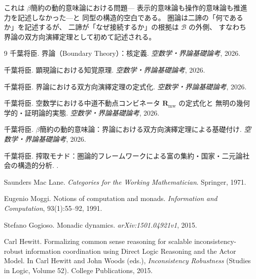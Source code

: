 \documentclass[11pt,a4paper]{ltjsarticle}
\theoremstyle{definition}
\begin{document}
これは $\beta$簡約の動的意味論における問題---
表示的意味論も操作的意味論も推進力を記述しなかった---と
同型の構造的空白である。
圏論は二諦の「何であるか」を記述するが、
二諦が「なぜ接続するか」の根拠は $\mathcal{B}$ の外側、
すなわち界論の双方向演繹定理として初めて記述される。

\begin{thebibliography}{9}
千葉将臣.
\newblock 界論（Boundary Theory）：核定義.
\newblock \emph{空数学・界論基礎論考}, 2026.

千葉将臣.
\newblock 顕現論における知覚原理.
\newblock \emph{空数学・界論基礎論考}, 2026.

千葉将臣.
\newblock 界論における双方向演繹定理の定式化.
\newblock \emph{空数学・界論基礎論考}, 2026.

千葉将臣.
\newblock 空数学における中道不動点コンビネータ $\mathbf{R}_{\mathrm{mw}}$ の定式化と
無明の幾何学的・証明論的実態.
\newblock \emph{空数学・界論基礎論考}, 2026.

千葉将臣.
\newblock $\beta$簡約の動的意味論：界論における双方向演繹定理による基礎付け.
\newblock \emph{空数学・界論基礎論考}, 2026.

千葉将臣.
\newblock 搾取モナド：圏論的フレームワークによる富の集約・国家・二元論社会の構造的分析.
.

Saunders Mac Lane.
\newblock \emph{Categories for the Working Mathematician}.
\newblock Springer, 1971.

Eugenio Moggi.
\newblock Notions of computation and monads.
\newblock \emph{Information and Computation}, 93(1):55--92, 1991.

Stefano Gogioso.
\newblock Monadic dynamics.
\newblock \emph{arXiv:1501.04921v1}, 2015.

Carl Hewitt.
\newblock Formalizing common sense reasoning for scalable inconsistency-robust
information coordination using Direct Logic Reasoning and the Actor Model.
\newblock In Carl Hewitt and John Woods (eds.),
\emph{Inconsistency Robustness} (Studies in Logic, Volume 52).
College Publications, 2015.
\end{thebibliography}
\end{document}
